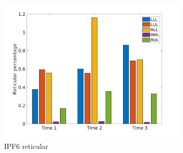 \begin{figure}[H]
\begin{subfigure}{.46\linewidth}%
  \includegraphics[width=\linewidth,trim={{.0\wd0} {.0\wd0} {.0\wd0} {.0\wd0}},clip]{Appendix/Image_AppexA/LobarDistribution/IPF6ReticularLobarRegionDiseaseDistributionOverTime.jpg}
  \caption{IPF6 reticular}
  \label{fig:IPF6LobarRegionDiseaseDistributionOverTime-b}
\end{subfigure}
\begin{subfigure}{.46\linewidth}%

\end{subfigure}
\end{figure}
